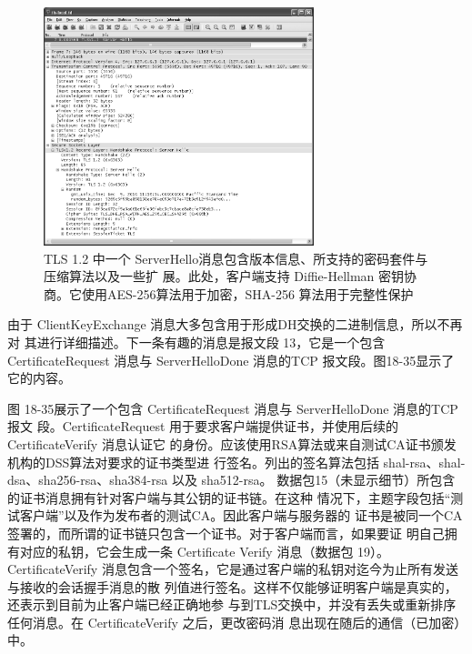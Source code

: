 \begin{figure}[!htb]
    \centering
	\includegraphics[width=0.7\textwidth]{imgs/18/18-33.png}
	\caption{TLS 1.2 中一个 ServerHello消息包含版本信息、所支持的密码套件与压缩算法以及一些扩
            展。此处，客户端支持 Diffie-Hellman 密钥协商。它使用AES-256算法用于加密，SHA-256
            算法用于完整性保护}
\end{figure}

由于 ClientKeyExchange 消息大多包含用于形成DH交换的二进制信息，所以不再对
其进行详细描述。下一条有趣的消息是报文段 13，它是一个包含 CertificateRequest 消息与
ServerHelloDone 消息的TCP 报文段。图18-35显示了它的内容。

图 18-35展示了一个包含 CertificateRequest 消息与 ServerHelloDone 消息的TCP报文
段。CertificateRequest 用于要求客户端提供证书，并使用后续的 CertificateVerify 消息认证它
的身份。应该使用RSA算法或来自测试CA证书颁发机构的DSS算法对要求的证书类型进
行签名。列出的签名算法包括 shal-rsa、shal-dsa、sha256-rsa、sha384-rsa 以及 sha512-rsa。
数据包15（未显示细节）所包含的证书消息拥有针对客户端与其公钥的证书链。在这种
情况下，主题字段包括“测试客户端”以及作为发布者的测试CA。因此客户端与服务器的
证书是被同一个CA签署的，而所谓的证书链只包含一个证书。对于客户端而言，如果要证
明自己拥有对应的私钥，它会生成一条 Certificate Verify 消息（数据包 19）。CertificateVerify
消息包含一个签名，它是通过客户端的私钥对迄今为止所有发送与接收的会话握手消息的散
列值进行签名。这样不仅能够证明客户端是真实的，还表示到目前为止客户端已经正确地参
与到TLS交换中，并没有丢失或重新排序任何消息。在 CertificateVerify 之后，更改密码消
息出现在随后的通信（已加密）中。

